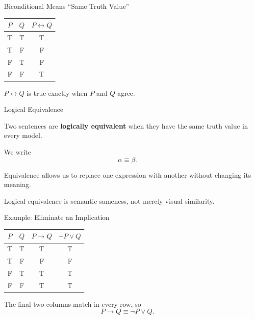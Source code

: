 \documentclass[aspectratio=169,10pt]{beamer}
\begin{document}
\begin{frame}[shrink=12]{Biconditional Means ``Same Truth Value''}
  \begin{center}
    \renewcommand{\arraystretch}{1.30}
    \begin{tabular}{c|c|c}
      $P$ & $Q$ & $P\leftrightarrow Q$ \\\hline
      T & T & T \\
      T & F & F \\
      F & T & F \\
      F & F & T
    \end{tabular}
  \end{center}

  $P\leftrightarrow Q$ is true exactly when $P$ and $Q$ agree.
\end{frame}

\begin{frame}[shrink=12]{Logical Equivalence}
  \begin{cpdefinition}
    Two sentences are \textbf{logically equivalent} when they have the same truth value in every model.
  \end{cpdefinition}

  We write
  \[
    \alpha \equiv \beta.
  \]

  Equivalence allows us to replace one expression with another without changing its meaning.

  \begin{keyidea}
    Logical equivalence is semantic sameness, not merely visual similarity.
  \end{keyidea}
\end{frame}

\begin{frame}[shrink=12]{Example: Eliminate an Implication}
  \begin{center}
    \renewcommand{\arraystretch}{1.25}
    \begin{tabular}{c|c|c|c}
      $P$ & $Q$ & $P\rightarrow Q$ & $\neg P\lor Q$ \\\hline
      T & T & T & T \\
      T & F & F & F \\
      F & T & T & T \\
      F & F & T & T
    \end{tabular}
  \end{center}

  The final two columns match in every row, so
  \[
    P\rightarrow Q \equiv \neg P\lor Q.
  \]
\end{frame}
\end{document}
